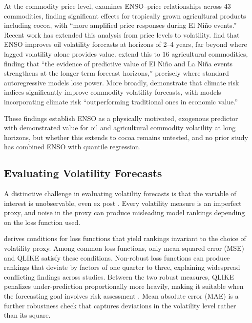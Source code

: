 At the commodity price level,
\textcite{ubilavaRoleNinoSouthern2018} examines ENSO--price
relationships across 43 commodities, finding significant effects for
tropically grown agricultural products including cocoa, with ``more
amplified price responses during El Niño events.'' Recent work has
extended this analysis from price levels to volatility.
\textcite{bouriNinoForecastabilityOilprice2021} find that ENSO improves
oil volatility forecasts at horizons of 2--4 years, far beyond where
lagged volatility alone provides value.
\textcite{bonatoNinoNinaForecastability2023} extend this to 16
agricultural commodities, finding that ``the evidence of predictive
value of El Niño and La Niña events strengthens at the longer term
forecast horizons,'' precisely where standard autoregressive models
lose power. More broadly,
\textcite{guoForecastingVolatilityCommodity2025} demonstrate that
climate risk indices significantly improve commodity volatility
forecasts, with models incorporating climate risk ``outperforming
traditional ones in economic value.''

These findings establish ENSO as a physically motivated, exogenous
predictor with demonstrated value for oil and agricultural commodity
volatility at long horizons, but whether this extends to cocoa remains
untested, and no prior study has combined ENSO with quantile regression.

\subsection{Evaluating Volatility Forecasts}
\label{sec:lit-evaluation}

A distinctive challenge in evaluating volatility forecasts is that the
variable of interest is unobservable, even ex post
\parencite{pattonVolatilityForecastComparison}. Every volatility
measure is an imperfect proxy, and noise in the proxy can produce
misleading model rankings depending on the loss function used.

\textcite{pattonVolatilityForecastComparison} derives conditions for
loss functions that yield rankings invariant to the choice of volatility
proxy. Among common loss functions, only mean squared error (MSE) and
QLIKE satisfy these conditions. Non-robust loss functions can produce
rankings that deviate by factors of one quarter to three, explaining
widespread conflicting findings across studies. Between the two robust
measures, QLIKE penalizes under-prediction proportionally more heavily,
making it suitable when the forecasting goal involves risk assessment
\parencite{lyocsaImprovingStockMarket2021,
clementsHarvestingHARXVolatility2024,
ghyselsDirectIteratedMultiperiod2019}.
Mean absolute error (MAE) is a further robustness check that captures
deviations in the volatility level rather than its square.

